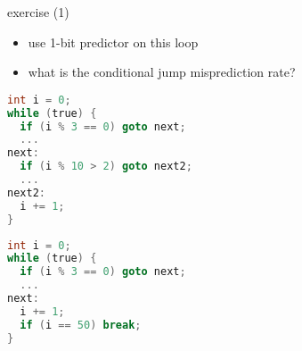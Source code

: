 

\begin{frame}[fragile,label=1BmispredEx]{exercise (1)}
\begin{itemize}
\item use 1-bit predictor on this loop
\item what is the conditional jump misprediction rate?
\end{itemize}
\begin{lstlisting}[language=C,style=small]
int i = 0;
while (true) {
  if (i % 3 == 0) goto next; 
  ...
next:
  if (i % 10 > 2) goto next2; 
  ...
next2:
  i += 1;
}
\end{lstlisting}
\end{frame}

\ifdefined\exCode\else\newsavebox\exCode\fi
\begin{lrbox}{\exCode}
\begin{lstlisting}[language=C,style=smaller]
int i = 0;
while (true) {
  if (i % 3 == 0) goto next;
  ...
next:
  i += 1;
  if (i == 50) break;
}
\end{lstlisting}
\end{lrbox}


